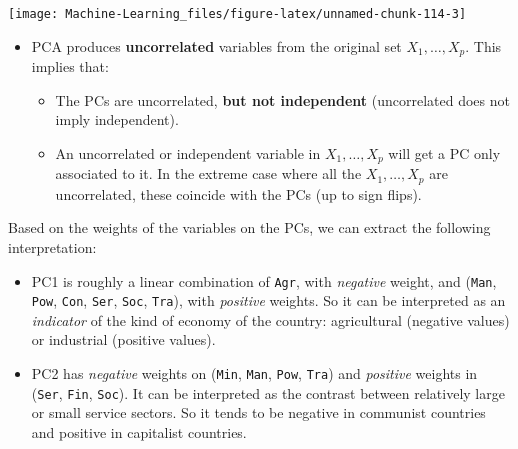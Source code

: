 \documentclass[]{book}
\newenvironment{Shaded}{\begin{snugshade}}{\end{snugshade}}
\newcommand{\DecValTok}[1]{\textcolor[rgb]{0.00,0.00,0.81}{#1}}
\newcommand{\CommentTok}[1]{\textcolor[rgb]{0.56,0.35,0.01}{\textit{#1}}}
\newcommand{\OperatorTok}[1]{\textcolor[rgb]{0.81,0.36,0.00}{\textbf{#1}}}
\newcommand{\NormalTok}[1]{#1}
\providecommand{\tightlist}{%
  \setlength{\itemsep}{0pt}\setlength{\parskip}{0pt}}
\newenvironment{rmdblock}[1]
  {\begin{shaded*}
  \begin{itemize}
  \renewcommand{\labelitemi}{
    \raisebox{-.7\height}[0pt][0pt]{
      {\setkeys{Gin}{width=2em,keepaspectratio}\texttt{[image: img/icons/\#1]}}
    }
  }
  \item
  }
  {
  \end{itemize}
  \end{shaded*}
  }
\newenvironment{rmdinsight}
  {\begin{rmdblock}{insight}}
  {\end{rmdblock}}
\begin{document}
\begin{center}\texttt{[image: Machine-Learning\_files/figure-latex/unnamed-chunk-114-3]} \end{center}

\begin{Shaded}
\end{Shaded}

\begin{rmdinsight}
PCA produces \textbf{uncorrelated} variables from the original set
\(X_1,\ldots,X_p\). This implies that:

\begin{itemize}
\tightlist
\item
  The PCs are uncorrelated, \textbf{but not independent} (uncorrelated
  does not imply independent).
\item
  An uncorrelated or independent variable in \(X_1,\ldots,X_p\) will get
  a PC only associated to it. In the extreme case where all the
  \(X_1,\ldots,X_p\) are uncorrelated, these coincide with the PCs (up
  to sign flips).
\end{itemize}
\end{rmdinsight}

Based on the weights of the variables on the PCs, we can extract the
following interpretation:

\begin{itemize}
\tightlist
\item
  PC1 is roughly a linear combination of \texttt{Agr}, with
  \emph{negative} weight, and (\texttt{Man}, \texttt{Pow}, \texttt{Con},
  \texttt{Ser}, \texttt{Soc}, \texttt{Tra}), with \emph{positive}
  weights. So it can be interpreted as an \emph{indicator} of the kind
  of economy of the country: agricultural (negative values) or
  industrial (positive values).
\item
  PC2 has \emph{negative} weights on (\texttt{Min}, \texttt{Man},
  \texttt{Pow}, \texttt{Tra}) and \emph{positive} weights in
  (\texttt{Ser}, \texttt{Fin}, \texttt{Soc}). It can be interpreted as
  the contrast between relatively large or small service sectors. So it
  tends to be negative in communist countries and positive in capitalist
  countries.
\end{itemize}
\end{document}
